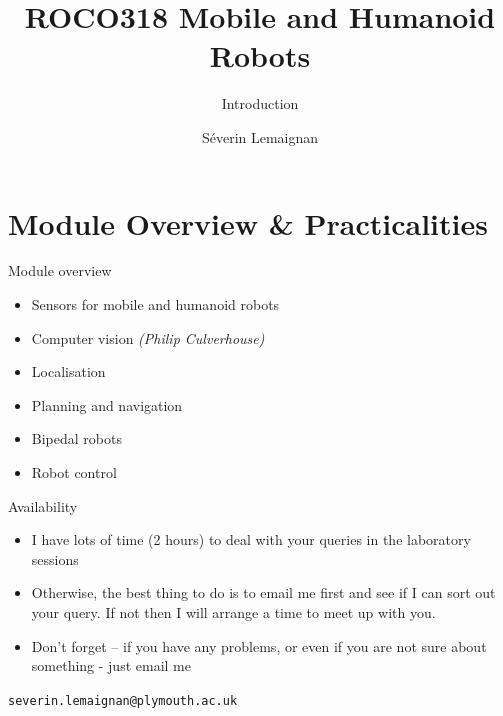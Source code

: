 \documentclass[compress]{beamer}
\title{ROCO318 \newline Mobile and Humanoid Robots}
\subtitle{Introduction}
\date{}
\author{Séverin Lemaignan}
\institute{Centre for Neural Systems and Robotics\\{\bf Plymouth University}}
\begin{document}

\maketitle


\section{Module Overview \& Practicalities}
\begin{frame}{Module overview}

\begin{itemize}
\item Sensors for mobile and humanoid robots
\item Computer vision \emph{(Philip Culverhouse)}
\item Localisation
\item Planning and navigation
\item Bipedal robots
\item Robot control
\end{itemize}

\end{frame}

\begin{frame}{Availability}

    \begin{itemize}
        \item I have lots of time (2 hours) to deal with your queries in the laboratory sessions
        \item  Otherwise, the best thing to do is to email me first and see if I can sort out your query. If not then I will arrange a time to meet up with you.
        \item Don't forget – if you have any problems, or even if you are not sure about something - just email me

    \end{itemize}

    \begin{center}
        \texttt{severin.lemaignan@plymouth.ac.uk}
    \end{center}
\end{frame}
\end{document}
